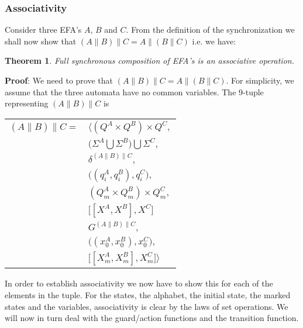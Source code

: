 \documentclass{article}
\newtheorem{theorem}{Theorem}
\begin{document}
\subsubsection{Associativity}

Consider three EFA's $A$, $B$ and $C$. From the definition of the
synchronization we shall now show that
 $(A\|B)\|C=A\|(B\|C)$ i.e. we have:
\begin{theorem}
   Full synchronous composition of EFA's is an associative
   operation.
\end{theorem}

\noindent \textbf{Proof}: We need to prove that $(A\|B)\|C =
A\|(B\|C)$. For simplicity, we assume that the three automata have
no common variables.
\newline\newline
\noindent The 9-tuple representing $(A\|B)\|C$ is
\begin{center}
\begin{tabular}{ll}
  $(A\|B)\|C =$ & $\Big \langle (Q^{A} \times Q^{B}) \times Q^{C},$\\
  & $ \big(\Sigma^{A} \bigcup \Sigma^{B} \big) \bigcup \Sigma^{C},$\\
  & $\delta^{(A\|B)\|C},$\\
  & $\big((q^{A}_i, q^{B}_i) , q^{C}_i\big),$\\
  & $(Q^{A}_m \times Q^{B}_m) \times Q^{C}_m,$\\
  & $\big[[X^{A}, X^{B}], X^{C}]$\\
  & $G^{(A\|B)\|C},$\\
  & $\big((x^{A}_0, x^{B}_0) , x^{C}_0\big),$\\
  & $\big[[X^{A}_m, X^{B}_m], X^{C}_m \big] \Big \rangle$
\end{tabular}
\end{center}

\noindent In order to establish associativity we now have to show
this for each of the elements in the tuple. For the states, the
alphabet, the initial state, the marked states and the variables,
associativity is clear by the laws of set operations. We will now
in turn deal with the guard/action functions and the transition
function.
\end{document}

